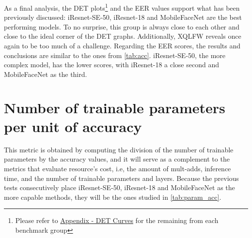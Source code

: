 \documentclass[class=report, crop=false, a4paper, 12pt]{standalone}
\begin{document}
As a final analysis, the DET plots\footnote{Please refer to \hyperref[sec:det_curves_appendix]{Appendix - DET Curves} for the remaining from each benchmark group} and the EER values support what has been previously discussed: iResnet-SE-50, iResnet-18 and MobileFaceNet are the best performing models. To no surprise, this group is always close to each other and close to the ideal corner of the DET graphs. Additionally, XQLFW reveals once again to be too much of a challenge. Regarding the EER scores, the results and conclusions are similar to the ones from \autoref{tab:acc}. iResnet-SE-50, the more complex model, has the lower scores, with iResnet-18 a close second and MobileFaceNet as the third.

\section{Number of trainable parameters per unit of accuracy}

\par This metric is obtained by computing the division of the number of trainable parameters by the accuracy values, and it will serve as a complement to the metrics that evaluate resource's cost, i.e, the amount of mult-adds, inference time, and the number of trainable parameters and layers. Because the previous tests consecutively place iResnet-SE-50, iResnet-18 and MobileFaceNet as the more capable methods, they will be the ones studied in \autoref{tab:param_acc}. 
\end{document}
